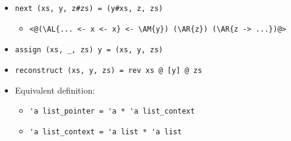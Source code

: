 \begin{frame}
\begin{itemize}
\item \lstinline.next (xs, y, z#zs) = (y#xs, z, zs).
\begin{itemize}
	\item
\begin{lstlisting}
<@(\AL{... <- x <- x} <- \AM{y}) (\AR{z}) (\AR{z -> ...})@>
\end{lstlisting}
\end{itemize}

\item \lstinline.assign (xs, _, zs) y = (xs, y, zs).

\item \lstinline.reconstruct (xs, y, zs) = rev xs @ [y] @ zs.

\item Equivalent definition:
\begin{itemize}
	\item \lstinline.'a list_pointer = 'a * 'a list_context.
	\item \lstinline.'a list_context = 'a list * 'a list.
\end{itemize}
\end{itemize}
\end{frame}

